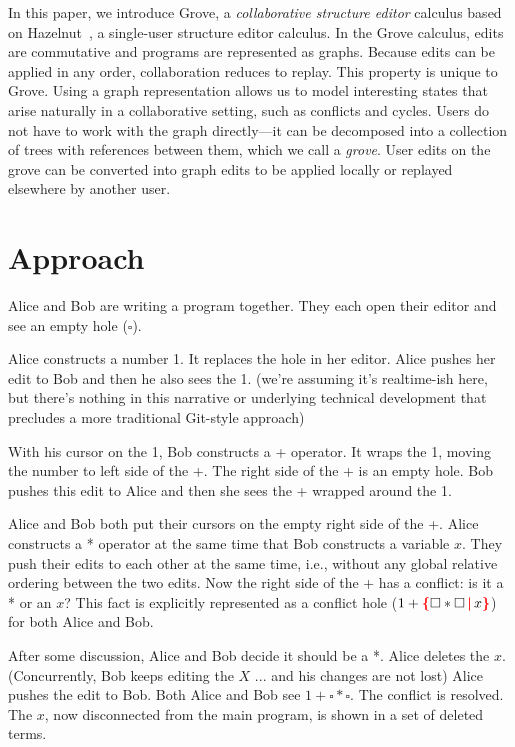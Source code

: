 \documentclass[nonacm, acmsmall, screen, review]{acmart}
\newcommand{\hole}{\ensuremath{\square}} %
\newcommand{\conflictHole}[1]{%
{\noexpandarg\StrSubstitute{#1}{,}{\textcolor{red}{\,\textbf{|}\,}}[\myargs]%
{\textcolor{red}{\textbf{\{}}\myargs\textcolor{red}{\textbf{\}}}}}}%
\begin{document}
In this paper, we introduce Grove, a \emph{collaborative structure editor} calculus based on Hazelnut~\cite{omar_hazelnut_2017}, a single-user structure editor calculus.
In the Grove calculus, edits are commutative and programs are represented as graphs.
Because edits can be applied in any order, collaboration reduces to replay.
This property is unique to Grove.
Using a graph representation allows us to model interesting states that arise naturally in a collaborative setting, such as conflicts and cycles.
Users do not have to work with the graph directly---it can be decomposed into a collection of trees with references between them, which we call a \emph{grove}.
User edits on the grove can be converted into graph edits to be applied locally or replayed elsewhere by another user.

\section{Approach}

Alice and Bob are writing a program together.
They each open their editor and see an empty hole ($\hole$).

Alice constructs a number 1.
It replaces the hole in her editor.
Alice pushes her edit to Bob and then he also sees the 1.
(we're assuming it's realtime-ish here, but there's nothing in this narrative or underlying technical development that precludes a more traditional Git-style approach)

With his cursor on the 1, Bob constructs a + operator.
It wraps the 1, moving the number to left side of the +.
The right side of the + is an empty hole.
Bob pushes this edit to Alice and then she sees the + wrapped around the 1.

Alice and Bob both put their cursors on the empty right side of the +.
Alice constructs a * operator at the same time that Bob constructs a variable $x$.
They push their edits to each other at the same time, i.e., without any global relative ordering between the two edits.
Now the right side of the + has a conflict: is it a * or an $x$?
This fact is explicitly represented as a conflict hole ($1 + \conflictHole{\hole * \hole, x}$) for both Alice and Bob.

After some discussion, Alice and Bob decide it should be a *.
Alice deletes the $x$.
(Concurrently, Bob keeps editing the $X$ ... and his changes are not lost)
Alice pushes the edit to Bob.
Both Alice and Bob see $1 + \hole * \hole$.
The conflict is resolved.
The $x$, now disconnected from the main program, is shown in a set of deleted terms.
\end{document}
